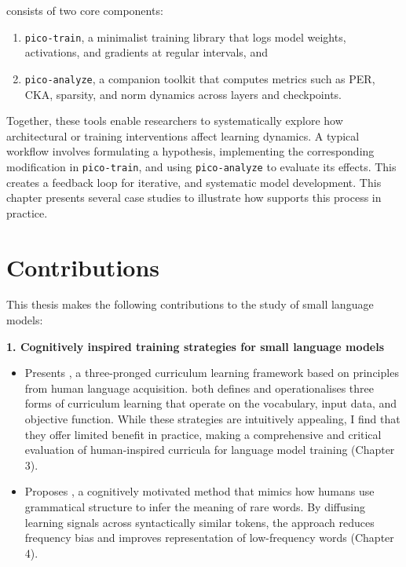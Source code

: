 \begin{itemize}
    \pico consists of two core components:
    
    \begin{enumerate}
        \item \texttt{pico-train}, a minimalist training library that logs model weights, activations, and gradients at regular intervals, and
        
        \item \texttt{pico-analyze}, a companion toolkit that computes metrics such as PER, CKA, sparsity, and norm dynamics across layers and checkpoints.
    \end{enumerate}

    Together, these tools enable researchers to systematically explore how architectural or training interventions affect learning dynamics. A typical workflow involves formulating a hypothesis, implementing the corresponding modification in \texttt{pico-train}, and using \texttt{pico-analyze} to evaluate its effects. This creates a feedback loop for iterative, and systematic model development. This chapter presents several case studies to illustrate how \pico supports this process in practice.

\end{itemize}

\section*{Contributions}

This thesis makes the following contributions to the study of small language models:

\vspace{1em}

\textbf{1. Cognitively inspired training strategies for small language models}

\begin{itemize}

    \item Presents \climb, a three-pronged curriculum learning framework based on principles from human language acquisition. \climb both defines and operationalises three forms of curriculum learning that operate on the vocabulary, input data, and objective function. While these strategies are intuitively appealing, I find that they offer limited benefit in practice, making \climb a comprehensive and critical evaluation of human-inspired curricula for language model training (Chapter 3).

    \item Proposes \smoothing, a cognitively motivated method that mimics how humans use grammatical structure to infer the meaning of rare words. By diffusing learning signals across syntactically similar tokens, the approach reduces frequency bias and improves representation of low-frequency words (Chapter 4).

\end{itemize}

